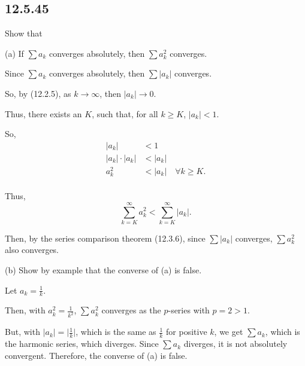 \documentclass[../hw3]{subfiles}
\begin{document}
\subsection*{12.5.45}

Show that 

(a) If $\sum a_k$ converges absolutely, then $\sum a^2_k$ converges.

Since $\sum a_k$ converges absolutely, then $\sum |a_k|$ converges. 

So, by (12.2.5), as $k\to\infty$, then $|a_k|\to 0$.

Thus, there exists an $K$, such that, for all $k\geq K$, $|a_k|<1$.

So,
\begin{align*}
    |a_k|&<1 \\
    |a_k|\cdot|a_k|&<|a_k| \\
    a_k^2&<|a_k| \quad \forall k \geq K. \\
\end{align*}

Thus, \[\sum_{k=K}^{\infty} a_k^2 < \sum_{k=K}^{\infty} |a_k|.\]

Then, by the series comparison theorem (12.3.6), since $\sum |a_k|$ converges, $\sum a_k^2$ also converges.


(b) Show by example that the converse of (a) is false.

Let $a_k=\frac{1}{k}$.

Then, with $a_k^2 = \frac{1}{k^2}$, $\sum a_k^2$ converges as the $p$-series with $p=2>1$.

But, with $|a_k|=\big|\frac{1}{k}\big|$, which is the same as $\frac{1}{k}$ for positive $k$, we get $\sum a_k$, which is the harmonic series, which diverges. Since $\sum a_k$ diverges, it is not absolutely convergent. Therefore, the converse of (a) is false. 
\end{document}
